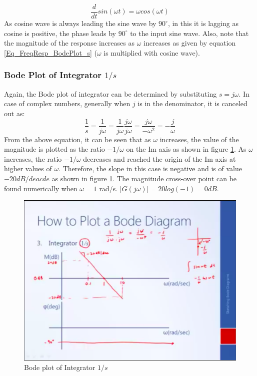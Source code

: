 \begin{equation}
	\frac{d}{dt} sin(\omega t) = \omega cos(\omega t) \label{Eq_FreqResp_BodePlot_s}
\end{equation}
As cosine wave is always leading the sine wave by $90^{\circ}$, in this it is lagging as cosine is positive, the phase leads by $90^{\circ}$ to the input sine wave. Also, note that the magnitude of the response increases as $\omega$ increases as given by equation \eqref{Eq_FreqResp_BodePlot_s} ($\omega$ is multiplied with cosine wave).

\subsubsection{Bode Plot of Integrator $1/s$}

Again, the Bode plot of integrator can be determined by substituting $s = j \omega$. In case of complex numbers, generally when $j$ is in the denominator, it is canceled out as:
\begin{equation}
	\frac{1}{s} = \frac{1}{j \omega} = \frac{1}{j \omega} \frac{j \omega}{j \omega} = \frac{j \omega}{- \omega^2} = -\frac{j}{\omega}
\end{equation}
From the above equation, it can be seen that as $\omega$ increases, the value of the magnitude is plotted as the ratio $- 1 /\omega$ on the Im axis as shown in figure \ref{Fig_FreqResp_BodePlot_1s}. As $\omega$ increases, the ratio $- 1 /\omega$ decreases and reached the origin of the Im axis at higher values of $\omega$. Therefore, the slope in this case is negative and is of value $-20 dB/deacde$ as shown in figure \ref{Fig_FreqResp_BodePlot_1s}. The magnitude cross-over point can be found numerically when $\omega = 1$ rad/s. $|G(j \omega)| = 20 log(-1) = 0 dB$.
\begin{figure}[h!]
	\centering
	\includegraphics[width=\linewidth]{Bilder/FreqResp_BodePlot_1s}
	\caption{Bode plot of Integrator $1/s$}
	\label{Fig_FreqResp_BodePlot_1s}
\end{figure}
\newpage

